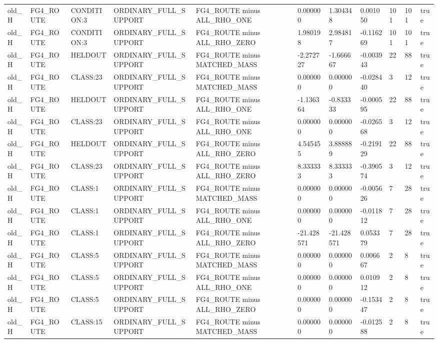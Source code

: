 \begin{tabular}{lllllllllll}
old\_H & FG4\_ROUTE & CONDITION:3 & ORDINARY\_FULL\_SUPPORT & FG4\_ROUTE minus ALL\_RHO\_ONE & 0.000000 & 1.304348 & 0.001050 & 101 & 101 & true \\
old\_H & FG4\_ROUTE & CONDITION:3 & ORDINARY\_FULL\_SUPPORT & FG4\_ROUTE minus ALL\_RHO\_ZERO & 1.980198 & 2.984817 & -0.116269 & 101 & 101 & true \\
old\_H & FG4\_ROUTE & HELDOUT & ORDINARY\_FULL\_SUPPORT & FG4\_ROUTE minus MATCHED\_MASS & -2.272727 & -1.666667 & -0.003943 & 22 & 88 & true \\
old\_H & FG4\_ROUTE & CLASS:23 & ORDINARY\_FULL\_SUPPORT & FG4\_ROUTE minus MATCHED\_MASS & 0.000000 & 0.000000 & -0.028440 & 3 & 12 & true \\
old\_H & FG4\_ROUTE & HELDOUT & ORDINARY\_FULL\_SUPPORT & FG4\_ROUTE minus ALL\_RHO\_ONE & -1.136364 & -0.833333 & -0.000595 & 22 & 88 & true \\
old\_H & FG4\_ROUTE & CLASS:23 & ORDINARY\_FULL\_SUPPORT & FG4\_ROUTE minus ALL\_RHO\_ONE & 0.000000 & 0.000000 & -0.026568 & 3 & 12 & true \\
old\_H & FG4\_ROUTE & HELDOUT & ORDINARY\_FULL\_SUPPORT & FG4\_ROUTE minus ALL\_RHO\_ZERO & 4.545455 & 3.888889 & -0.219129 & 22 & 88 & true \\
old\_H & FG4\_ROUTE & CLASS:23 & ORDINARY\_FULL\_SUPPORT & FG4\_ROUTE minus ALL\_RHO\_ZERO & 8.333333 & 8.333333 & -0.390574 & 3 & 12 & true \\
old\_H & FG4\_ROUTE & CLASS:1 & ORDINARY\_FULL\_SUPPORT & FG4\_ROUTE minus MATCHED\_MASS & 0.000000 & 0.000000 & -0.005626 & 7 & 28 & true \\
old\_H & FG4\_ROUTE & CLASS:1 & ORDINARY\_FULL\_SUPPORT & FG4\_ROUTE minus ALL\_RHO\_ONE & 0.000000 & 0.000000 & -0.011812 & 7 & 28 & true \\
old\_H & FG4\_ROUTE & CLASS:1 & ORDINARY\_FULL\_SUPPORT & FG4\_ROUTE minus ALL\_RHO\_ZERO & -21.428571 & -21.428571 & 0.053379 & 7 & 28 & true \\
old\_H & FG4\_ROUTE & CLASS:5 & ORDINARY\_FULL\_SUPPORT & FG4\_ROUTE minus MATCHED\_MASS & 0.000000 & 0.000000 & 0.006667 & 2 & 8 & true \\
old\_H & FG4\_ROUTE & CLASS:5 & ORDINARY\_FULL\_SUPPORT & FG4\_ROUTE minus ALL\_RHO\_ONE & 0.000000 & 0.000000 & 0.010912 & 2 & 8 & true \\
old\_H & FG4\_ROUTE & CLASS:5 & ORDINARY\_FULL\_SUPPORT & FG4\_ROUTE minus ALL\_RHO\_ZERO & 0.000000 & 0.000000 & -0.153447 & 2 & 8 & true \\
old\_H & FG4\_ROUTE & CLASS:15 & ORDINARY\_FULL\_SUPPORT & FG4\_ROUTE minus MATCHED\_MASS & 0.000000 & 0.000000 & -0.012588 & 2 & 8 & true \\

\end{tabular}
